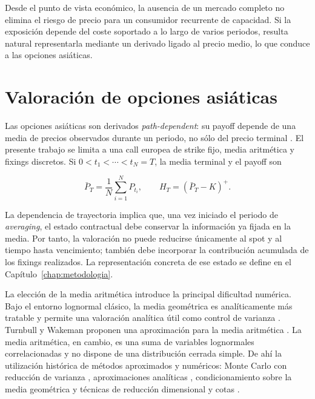 Desde el punto de vista económico, la ausencia de un mercado completo no elimina
el riesgo de precio para un consumidor recurrente de capacidad. Si la exposición
depende del coste soportado a lo largo de varios periodos, resulta natural
representarla mediante un derivado ligado al precio medio, lo que conduce a las
opciones asiáticas.

\section{Valoración de opciones asiáticas}
\label{sec:asian_options_literature}

Las opciones asiáticas son derivados \textit{path-dependent}: su payoff depende de
una media de precios observados durante un periodo, no sólo del precio terminal
\cite{uned_mod7_2026}. El presente trabajo se limita a una call europea de strike
fijo, media aritmética y fixings discretos. Si
$0<t_1<\cdots<t_N=T$, la media terminal y el payoff son

\begin{equation}
    \bar P_T=\frac{1}{N}\sum_{i=1}^{N}P_{t_i},
    \qquad
    H_T=(\bar P_T-K)^+ .
    \label{eq:asian_call_payoff_literature}
\end{equation}

La dependencia de trayectoria implica que, una vez iniciado el periodo de
\textit{averaging}, el estado contractual debe conservar la información ya fijada
en la media. Por tanto, la valoración no puede reducirse únicamente al spot y al
tiempo hasta vencimiento; también debe incorporar la contribución acumulada de los
fixings realizados. La representación concreta de ese estado se define en el
Capítulo~\ref{chap:metodologia}.

La elección de la media aritmética introduce la principal dificultad numérica. Bajo
el entorno lognormal clásico, la media geométrica es analíticamente más tratable y
permite una valoración analítica útil como control de varianza
\cite{kemna_vorst_1990}. Turnbull y Wakeman proponen una aproximación para la
media aritmética \cite{turnbull_wakeman_1991}. La media aritmética, en cambio, es una
suma de variables lognormales correlacionadas y no dispone de una distribución
cerrada simple. De ahí la utilización histórica de métodos aproximados y numéricos:
Monte Carlo con reducción de varianza \cite{kemna_vorst_1990}, aproximaciones
analíticas \cite{turnbull_wakeman_1991}, condicionamiento sobre la media geométrica
\cite{curran1994asian} y técnicas de reducción dimensional y cotas
\cite{rogers1995asian}.

